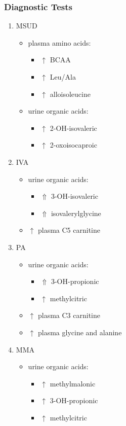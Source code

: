 \documentclass{scrartcl}
\begin{document}
\subsubsection{Diagnostic Tests}
\label{sec:org296acd0}
\begin{enumerate}
\item MSUD
\label{sec:org5a5a09d}
\begin{itemize}
\item plasma amino acids:
\begin{itemize}
\item \(\uparrow\) BCAA
\item \(\uparrow\) Leu/Ala
\item \(\uparrow\) alloisoleucine
\end{itemize}
\item urine organic acids:
\begin{itemize}
\item \(\uparrow\) 2-OH-isovaleric
\item \(\uparrow\) 2-oxoisocaproic
\end{itemize}
\end{itemize}

\item IVA
\label{sec:orgb3c99f1}
\begin{itemize}
\item urine organic acids:
\begin{itemize}
\item \(\Uparrow\) 3-OH-isovaleric
\item \(\Uparrow\) isovalerylglycine
\end{itemize}
\item \(\uparrow\) plasma C5 carnitine
\end{itemize}

\item PA
\label{sec:org82c4f69}
\begin{itemize}
\item urine organic acids:
\begin{itemize}
\item \(\Uparrow\) 3-OH-propionic
\item \(\uparrow\) methylcitric
\end{itemize}
\item \(\uparrow\) plasma C3 carnitine
\item \(\uparrow\) plasma glycine and alanine
\end{itemize}

\item MMA
\label{sec:orgf1557bb}
\begin{itemize}
\item urine organic acids:
\begin{itemize}
\item \(\uparrow\) methylmalonic
\item \(\uparrow\) 3-OH-propionic
\item \(\uparrow\) methylcitric
\end{itemize}


\end{itemize}
\end{enumerate}
\end{document}

